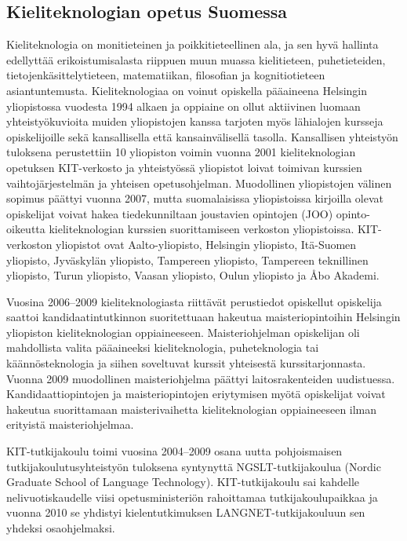 \begin{multicols}{2}
\subsection{Kieliteknologian opetus Suomessa}

Kieliteknologia on monitieteinen ja poikkitieteellinen ala, ja sen hyvä hallinta edellyttää erikoistumisalasta riippuen muun muassa kielitieteen, puhetieteiden, tietojenkäsittelytieteen, matematiikan, filosofian ja kognitiotieteen asiantuntemusta. Kieliteknologiaa on voinut opiskella pääaineena Helsingin yliopistossa vuodesta 1994 alkaen ja oppiaine on ollut aktiivinen luomaan yhteistyökuvioita muiden yliopistojen kanssa tarjoten myös lähialojen kursseja opiskelijoille sekä kansallisella että kansainvälisellä tasolla. Kansallisen yhteistyön tuloksena perustettiin 10 yliopiston voimin vuonna 2001 kieliteknologian opetuksen KIT-verkosto ja yhteistyössä yliopistot loivat toimivan kurssien vaihtojärjestelmän ja yhteisen opetusohjelman.  Muodollinen yliopistojen välinen sopimus päättyi vuonna 2007, mutta suomalaisissa yliopistoissa kirjoilla olevat opiskelijat voivat hakea tiedekunniltaan joustavien opintojen (JOO) opinto-oikeutta kieliteknologian kurssien suorittamiseen verkoston yliopistoissa. KIT-verkoston yliopistot ovat Aalto-yliopisto, Helsingin yliopisto, Itä-Suomen yliopisto, Jyväskylän yliopisto, Tampereen yliopisto, Tampereen teknillinen yliopisto, Turun yliopisto, Vaasan yliopisto, Oulun yliopisto ja Åbo Akademi.

Vuosina 2006--2009 kieliteknologiasta riittävät perustiedot opiskellut opiskelija saattoi kandidaatintutkinnon suoritettuaan hakeutua maisteriopintoihin Helsingin yliopiston kieliteknologian oppiaineeseen.  Maisteriohjelman opiskelijan oli mahdollista valita pääaineeksi kieliteknologia, puheteknologia tai käännösteknologia ja siihen soveltuvat kurssit yhteisestä kurssitarjonnasta. Vuonna 2009 muodollinen maisteriohjelma päättyi laitosrakenteiden uudistuessa.  Kandidaattiopintojen ja maisteriopintojen eriytymisen myötä opiskelijat voivat hakeutua suorittamaan maisterivaihetta kieliteknologian oppiaineeseen ilman erityistä maisteriohjelmaa.

KIT-tutkijakoulu toimi vuosina 2004--2009 osana uutta pohjoismaisen tutkijakoulutusyhteistyön tuloksena syntynyttä NGSLT-tutkijakoulua (Nordic Graduate School of Language Technology). KIT-tutkijakoulu sai kahdelle nelivuotiskaudelle viisi opetusministeriön rahoittamaa tutkijakoulupaikkaa ja vuonna 2010 se yhdistyi kielentutkimuksen LANGNET-tutkijakouluun sen yhdeksi osaohjelmaksi.


\end{multicols}
